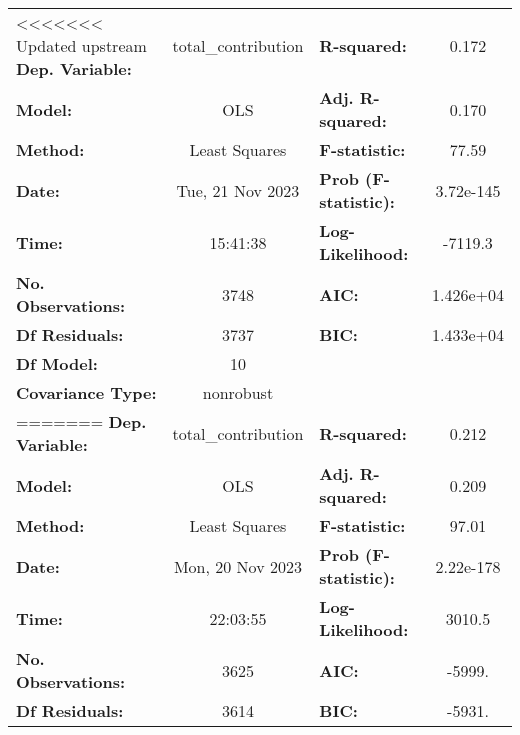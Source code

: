 \begin{center}
\begin{tabular}{lclc}
\toprule
<<<<<<< Updated upstream
\textbf{Dep. Variable:}                   & total\_contribution & \textbf{  R-squared:         } &     0.172   \\
\textbf{Model:}                           &         OLS         & \textbf{  Adj. R-squared:    } &     0.170   \\
\textbf{Method:}                          &    Least Squares    & \textbf{  F-statistic:       } &     77.59   \\
\textbf{Date:}                            &   Tue, 21 Nov 2023  & \textbf{  Prob (F-statistic):} & 3.72e-145   \\
\textbf{Time:}                            &       15:41:38      & \textbf{  Log-Likelihood:    } &   -7119.3   \\
\textbf{No. Observations:}                &          3748       & \textbf{  AIC:               } & 1.426e+04   \\
\textbf{Df Residuals:}                    &          3737       & \textbf{  BIC:               } & 1.433e+04   \\
\textbf{Df Model:}                        &            10       & \textbf{                     } &             \\
\textbf{Covariance Type:}                 &      nonrobust      & \textbf{                     } &             \\
=======
\textbf{Dep. Variable:}                  & total\_contribution & \textbf{  R-squared:         } &     0.212   \\
\textbf{Model:}                          &         OLS         & \textbf{  Adj. R-squared:    } &     0.209   \\
\textbf{Method:}                         &    Least Squares    & \textbf{  F-statistic:       } &     97.01   \\
\textbf{Date:}                           &   Mon, 20 Nov 2023  & \textbf{  Prob (F-statistic):} & 2.22e-178   \\
\textbf{Time:}                           &       22:03:55      & \textbf{  Log-Likelihood:    } &    3010.5   \\
\textbf{No. Observations:}               &          3625       & \textbf{  AIC:               } &    -5999.   \\
\textbf{Df Residuals:}                   &          3614       & \textbf{  BIC:               } &    -5931.   \\

\end{tabular}
\end{center}
